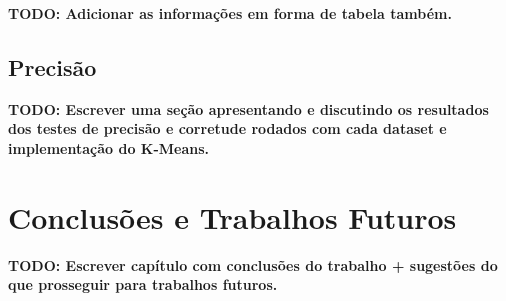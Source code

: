 \documentclass[12pt,
openright, 
oneside, %
a4paper,    %
brazil]{facom-ufu-abntex2}
\begin{document}
\textbf{TODO: Adicionar as informações em forma de tabela também.}





\section{Precisão}
\label{sec:testesDePrecisao}


\textbf{TODO: Escrever uma seção apresentando e discutindo os resultados dos testes de precisão e corretude rodados com cada dataset e implementação do K-Means.}






\chapter{Conclusões e Trabalhos Futuros}


\textbf{TODO: Escrever capítulo com conclusões do trabalho + sugestões do que prosseguir para trabalhos futuros.}











\postextual


\end{document}
